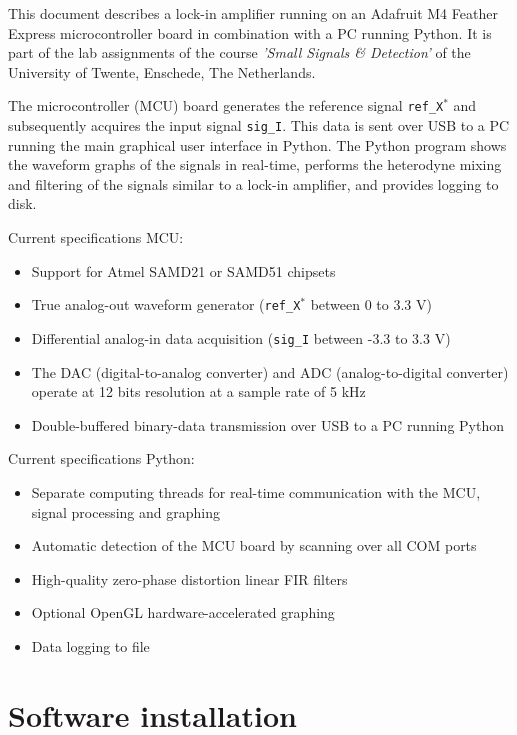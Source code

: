\documentclass{article}
\newcommand{\code}[1]{\mbox{\texttt{#1}}}
\newcommand{\refXs}{\code{ref\_X$^*$}}
\newcommand{\sigI}{\code{sig\_I}}
\begin{document}
This document describes a lock-in amplifier running on an Adafruit M4 Feather Express microcontroller board in combination with a PC running Python. It is part of the lab assignments of the course \textit{'Small Signals \& Detection'} of the University of Twente, Enschede, The Netherlands.

The microcontroller (MCU) board generates the reference signal \refXs{} and subsequently acquires the input signal \sigI{}. This data is sent over USB to a PC running the main graphical user interface in Python. The Python program shows the waveform graphs of the signals in real-time, performs the heterodyne mixing and filtering of the signals similar to a lock-in amplifier, and provides logging to disk.

\bigskip\noindent
Current specifications MCU:
\begin{itemize}
\item{Support for Atmel SAMD21 or SAMD51 chipsets}
\item{True analog-out waveform generator (\refXs{} between 0 to 3.3 V)}
\item{Differential analog-in data acquisition (\sigI{} between -3.3 to 3.3 V)}
\item{The DAC (digital-to-analog converter) and ADC (analog-to-digital converter) operate at 12 bits resolution at a sample rate of 5 kHz}
\item{Double-buffered binary-data transmission over USB to a PC running Python}
\end{itemize}

\bigskip\noindent
Current specifications Python:
\begin{itemize}
\item{Separate computing threads for real-time communication with the MCU, signal processing and graphing}
\item{Automatic detection of the MCU board by scanning over all COM ports}
\item{High-quality zero-phase distortion linear FIR filters}
\item{Optional OpenGL hardware-accelerated graphing}
\item{Data logging to file}
\end{itemize}

%
%

\newpage
\section{Software installation}
\end{document}
